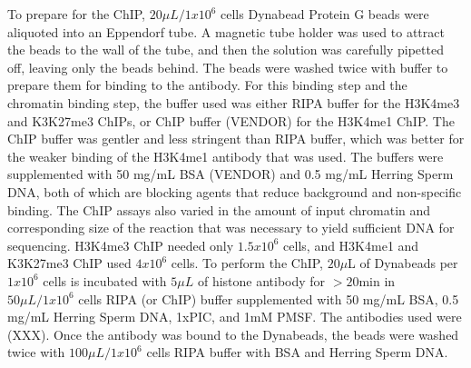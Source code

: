 \documentclass[10pt,letterpaper]{article}
\begin{document}
To prepare for the ChIP, \(20\mu L/1x10^6\) cells Dynabead Protein G
beads were aliquoted into an Eppendorf tube. A magnetic tube holder was
used to attract the beads to the wall of the tube, and then the solution
was carefully pipetted off, leaving only the beads behind. The beads
were washed twice with buffer to prepare them for binding to the
antibody. For this binding step and the chromatin binding step, the
buffer used was either RIPA buffer for the H3K4me3 and K3K27me3 ChIPs,
or ChIP buffer (VENDOR) for the H3K4me1 ChIP. The ChIP buffer was
gentler and less stringent than RIPA buffer, which was better for the
weaker binding of the H3K4me1 antibody that was used. The buffers were
supplemented with 50 mg/mL BSA (VENDOR) and 0.5 mg/mL Herring Sperm DNA,
both of which are blocking agents that reduce background and
non-specific binding. The ChIP assays also varied in the amount of input
chromatin and corresponding size of the reaction that was necessary to
yield sufficient DNA for sequencing. H3K4me3 ChIP needed only
\(1.5 x 10^6\) cells, and H3K4me1 and K3K27me3 ChIP used \(4 x 10^6\)
cells. To perform the ChIP, \(20\mu\)L of Dynabeads per \(1 x 10^6\)
cells is incubated with \(5\mu L\) of histone antibody for \(>20\)min in
\(50\mu L/1x10^6\) cells RIPA (or ChIP) buffer supplemented with 50
mg/mL BSA, 0.5 mg/mL Herring Sperm DNA, 1xPIC, and 1mM PMSF. The
antibodies used were (XXX). Once the antibody was bound to the
Dynabeads, the beads were washed twice with \(100\mu L/1x10^6\) cells
RIPA buffer with BSA and Herring Sperm DNA.
\end{document}
